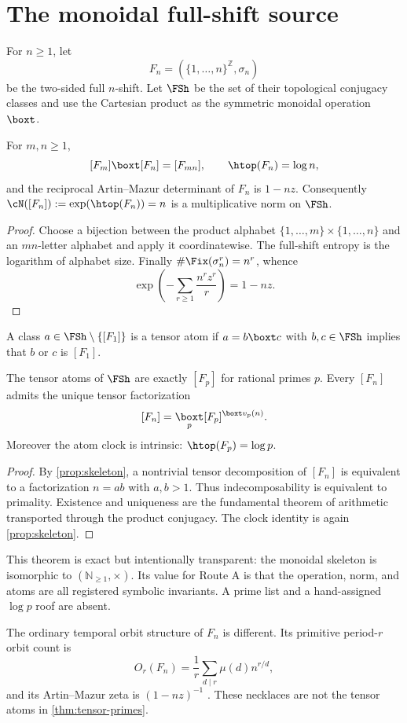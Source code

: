 \section{The monoidal full-shift source}

For $n\geq1$, let
\[
  F_n=(\{1,\ldots,n\}^{\mathbb Z},\sigma_n)
\]
be the two-sided full $n$-shift.  Let $\FSh$ be the set of their topological
conjugacy classes and use the Cartesian product as the symmetric monoidal
operation $\boxt$.

\begin{proposition}
\label{prop:skeleton}
For $m,n\geq1$,
\[
 [F_m]\boxt[F_n]=[F_{mn}],\qquad
 \htop(F_n)=\log n,
\]
and the reciprocal Artin--Mazur determinant of $F_n$ is $1-nz$.
Consequently $\cN([F_n]):=\exp(\htop(F_n))=n$ is a multiplicative norm on
$\FSh$.
\end{proposition}

\begin{proof}
Choose a bijection between the product alphabet
$\{1,\ldots,m\}\times\{1,\ldots,n\}$ and an $mn$-letter alphabet and apply it
coordinatewise.  The full-shift entropy is the logarithm of alphabet size.
Finally $\#\Fix(\sigma_n^r)=n^r$, whence
\[
 \exp\left(-\sum_{r\geq1}\frac{n^rz^r}{r}\right)=1-nz.
\]
\end{proof}

\begin{definition}
A class $a\in\FSh\setminus\{[F_1]\}$ is a tensor atom if
$a=b\boxt c$ with $b,c\in\FSh$ implies that $b$ or $c$ is $[F_1]$.
\end{definition}

\begin{theorem}
\label{thm:tensor-primes}
The tensor atoms of $\FSh$ are exactly $[F_p]$ for rational primes $p$.
Every $[F_n]$ admits the unique tensor factorization
\[
  [F_n]=\mathop{\boxt}_{p}[F_p]^{\boxt v_p(n)}.
\]
Moreover the atom clock is intrinsic:
$\htop(F_p)=\log p$.
\end{theorem}

\begin{proof}
By \cref{prop:skeleton}, a nontrivial tensor decomposition of $[F_n]$ is
equivalent to a factorization $n=ab$ with $a,b>1$.  Thus indecomposability is
equivalent to primality.  Existence and uniqueness are the fundamental
theorem of arithmetic transported through the product conjugacy.  The clock
identity is again \cref{prop:skeleton}.
\end{proof}

This theorem is exact but intentionally transparent: the monoidal skeleton
is isomorphic to $(\mathbb N_{\geq1},\times)$.  Its value for Route A is that
the operation, norm, and atoms are all registered symbolic invariants.  A
prime list and a hand-assigned $\log p$ roof are absent.

The ordinary temporal orbit structure of $F_n$ is different.  Its primitive
period-$r$ orbit count is
\[
  O_r(F_n)=\frac1r\sum_{d\mid r}\mu(d)n^{r/d},
\]
and its Artin--Mazur zeta is $(1-nz)^{-1}$
\citep{artinmazur1965,bowenlanford1970,byszewskigraffward2021}.  These
necklaces are not the tensor atoms in \cref{thm:tensor-primes}.
